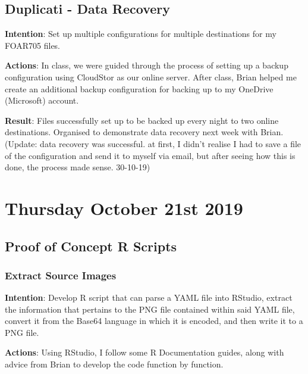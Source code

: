 \documentclass{article}
\begin{document}
\subsection{Duplicati - Data Recovery}

\textbf{Intention}: Set up multiple configurations for multiple destinations for my FOAR705 files.

\textbf{Actions}: In class, we were guided through the process of setting up a backup configuration using CloudStor as our online server. After class, Brian helped me create an additional backup configuration for backing up to my OneDrive (Microsoft) account.


\textbf{Result}: Files successfully set up to be backed up every night to two online destinations. Organised to demonstrate data recovery next week with Brian. (Update: data recovery was successful. at first, I didn't realise I had to save a file of the configuration and send it to myself via email, but after seeing how this is done, the process made sense. 30-10-19)

\newpage
\section{Thursday October 21st 2019}

\subsection{Proof of Concept R Scripts}

\subsubsection{Extract Source Images}

\textbf{Intention}: Develop R script that can parse a YAML file into RStudio, extract the information that pertains to the PNG file contained within said YAML file, convert it from the Base64 language in which it is encoded, and then write it to a PNG file.

\textbf{Actions}: Using RStudio, I follow some R Documentation guides, along with advice from Brian to develop the code function by function.
\end{document}
